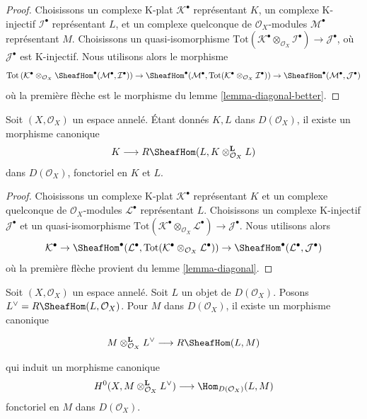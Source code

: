 \begin{proof}
Choisissons un complexe K-plat $\mathcal{K}^\bullet$ représentant $K$, un complexe K-injectif $\mathcal{I}^\bullet$ représentant $L$, et un complexe quelconque de $\mathcal{O}_X$-modules $\mathcal{M}^\bullet$ représentant $M$. Choisissons un quasi-isomorphisme $\text{Tot}(\mathcal{K}^\bullet \otimes_{\mathcal{O}_X} \mathcal{I}^\bullet)
\to \mathcal{J}^\bullet$, où $\mathcal{J}^\bullet$ est K-injectif. Nous utilisons alors le morphisme $$
\text{Tot}\left(
\mathcal{K}^\bullet \otimes_{\mathcal{O}_X}
\SheafHom^\bullet(\mathcal{M}^\bullet, \mathcal{I}^\bullet)
\right)
\to
\SheafHom^\bullet(\mathcal{M}^\bullet,
\text{Tot}(\mathcal{K}^\bullet \otimes_{\mathcal{O}_X} \mathcal{I}^\bullet))
\to
\SheafHom^\bullet(\mathcal{M}^\bullet, \mathcal{J}^\bullet)
$$ où la première flèche est le morphisme du lemme \ref{lemma-diagonal-better}.
\end{proof}

\begin{lemma}

\label{lemma-internal-hom-diagonal}
Soit $(X, \mathcal{O}_X)$ un espace annelé. Étant donnés $K, L$ dans $D(\mathcal{O}_X)$, il existe un morphisme canonique $$
K \longrightarrow R\SheafHom(L, K \otimes_{\mathcal{O}_X}^\mathbf{L} L)
$$ dans $D(\mathcal{O}_X)$, fonctoriel en $K$ et $L$.
\end{lemma}

\begin{proof}
Choisissons un complexe K-plat $\mathcal{K}^\bullet$ représentant $K$ et un complexe quelconque de $\mathcal{O}_X$-modules $\mathcal{L}^\bullet$ représentant $L$. Choisissons un complexe K-injectif $\mathcal{J}^\bullet$ et un quasi-isomorphisme $\text{Tot}(\mathcal{K}^\bullet \otimes_{\mathcal{O}_X} \mathcal{L}^\bullet)
\to \mathcal{J}^\bullet$. Nous utilisons alors $$
\mathcal{K}^\bullet \to
\SheafHom^\bullet(\mathcal{L}^\bullet,
\text{Tot}(\mathcal{K}^\bullet \otimes_{\mathcal{O}_X} \mathcal{L}^\bullet))
\to
\SheafHom^\bullet(\mathcal{L}^\bullet, \mathcal{J}^\bullet)
$$ où la première flèche provient du lemme \ref{lemma-diagonal}.
\end{proof}

\begin{lemma}

\label{lemma-dual}

Soit $(X, \mathcal{O}_X)$ un espace annelé. Soit $L$ un objet de $D(\mathcal{O}_X)$. Posons $L^\vee = R\SheafHom(L, \mathcal{O}_X)$. Pour $M$ dans $D(\mathcal{O}_X)$, il existe un morphisme canonique

\begin{equation}
\label{equation-eval}
M \otimes^\mathbf{L}_{\mathcal{O}_X} L^\vee
\longrightarrow
R\SheafHom(L, M)
\end{equation}

qui induit un morphisme canonique
$$
H^0(X, M \otimes^\mathbf{L}_{\mathcal{O}_X} L^\vee)
\longrightarrow
\Hom_{D(\mathcal{O}_X)}(L, M)
$$
fonctoriel en $M$ dans $D(\mathcal{O}_X)$.

\end{lemma}

